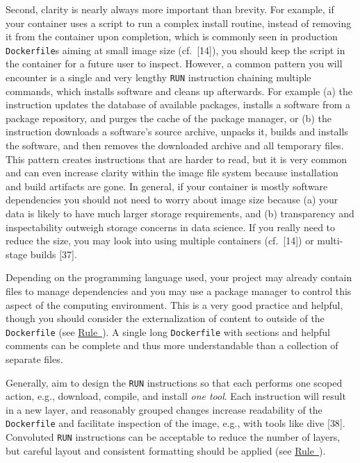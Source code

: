 \documentclass[10pt,letterpaper]{article}
\begin{document}
Second, clarity is nearly always more important than brevity. For
example, if your container uses a script to run a complex install
routine, instead of removing it from the container upon completion,
which is commonly seen in production \texttt{Dockerfile}s aiming at
small image size (cf.~{[}14{]}), you should keep the script in the
container for a future user to inspect. However, a common pattern you
will encounter is a single and very lengthy \texttt{RUN} instruction
chaining multiple commands, which installs software and cleans up
afterwards. For example (a) the instruction updates the database of
available packages, installs a software from a package repository, and
purges the cache of the package manager, or (b) the instruction
downloads a software's source archive, unpacks it, builds and installs
the software, and then removes the downloaded archive and all temporary
files. This pattern creates instructions that are harder to read, but it
is very common and can even increase clarity within the image file
system because installation and build artifacts are gone. In general, if
your container is mostly software dependencies you should not need to
worry about image size because (a) your data is likely to have much
larger storage requirements, and (b) transparency and inspectability
outweigh storage concerns in data science. If you really need to reduce
the size, you may look into using multiple containers (cf.~{[}14{]}) or
multi-stage builds {[}37{]}.

Depending on the programming language used, your project may already
contain files to manage dependencies and you may use a package manager
to control this aspect of the computing environment. This is a very good
practice and helpful, though you should consider the externalization of
content to outside of the \texttt{Dockerfile} (see
\hyperref[{rule:mount}]{Rule~}). A single long
\texttt{Dockerfile} with sections and helpful comments can be complete
and thus more understandable than a collection of separate files.

Generally, aim to design the \texttt{RUN} instructions so that each
performs one scoped action, e.g., download, compile, and install
\emph{one tool}. Each instruction will result in a new layer, and
reasonably grouped changes increase readability of the
\texttt{Dockerfile} and facilitate inspection of the image, e.g., with
tools like dive {[}38{]}. Convoluted \texttt{RUN} instructions can be
acceptable to reduce the number of layers, but careful layout and
consistent formatting should be applied (see
\hyperref[{rule:formatting}]{Rule~}).
\end{document}
